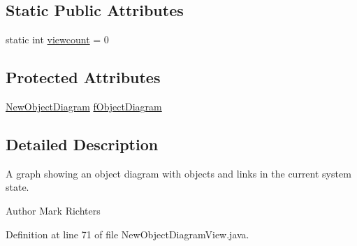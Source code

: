 \subsection*{Static Public Attributes}
\begin{DoxyCompactItemize}
\item 
static int \hyperlink{classorg_1_1tzi_1_1use_1_1gui_1_1views_1_1diagrams_1_1objectdiagram_1_1_new_object_diagram_view_a11a470c191107c665d2382ba26a9cbb1}{viewcount} = 0
\end{DoxyCompactItemize}
\subsection*{Protected Attributes}
\begin{DoxyCompactItemize}
\item 
\hyperlink{classorg_1_1tzi_1_1use_1_1gui_1_1views_1_1diagrams_1_1objectdiagram_1_1_new_object_diagram}{New\-Object\-Diagram} \hyperlink{classorg_1_1tzi_1_1use_1_1gui_1_1views_1_1diagrams_1_1objectdiagram_1_1_new_object_diagram_view_ad7a1ba78a6a7ca88f1766a8d6df07f90}{f\-Object\-Diagram}
\end{DoxyCompactItemize}


\subsection{Detailed Description}
A graph showing an object diagram with objects and links in the current system state.

\begin{DoxyAuthor}{Author}
Mark Richters 
\end{DoxyAuthor}


Definition at line 71 of file New\-Object\-Diagram\-View.\-java.



